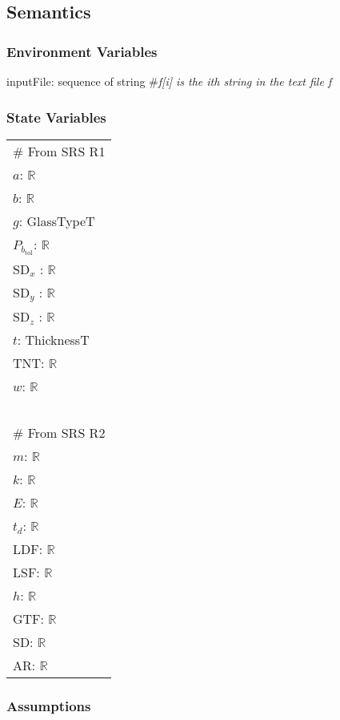 \documentclass[12pt, titlepage]{article}
\begin{document}
\subsection{Semantics}

\subsubsection{Environment Variables}

inputFile: sequence of string \#\textit{f[i] is the ith string in the text file f}

\subsubsection{State Variables}

\renewcommand{\arraystretch}{1.2}
\begin{longtable*}[l]{l} 
\# From SRS R1\\
$a$: $\mathbb{R}$ \\
$b$: $\mathbb{R}$ \\
$g$: GlassTypeT \\
$P_{b_\text{tol}}$: $\mathbb{R}$ \\
$\text{SD}_x$ : $\mathbb{R}$ \\
$\text{SD}_y$ : $\mathbb{R}$ \\
$\text{SD}_z$ : $\mathbb{R}$ \\
$t$: ThicknessT \\
TNT: $\mathbb{R}$ \\
$w$: $\mathbb{R}$ \\
~\\
\# From SRS R2\\
$m$: $\mathbb{R}$ \\
$k$: $\mathbb{R}$ \\
$E$: $\mathbb{R}$ \\
$t_d$: $\mathbb{R}$ \\
LDF: $\mathbb{R}$ \\
LSF: $\mathbb{R}$ \\
$h$: $\mathbb{R}$ \\
GTF: $\mathbb{R}$\\
SD: $\mathbb{R}$\\
AR: $\mathbb{R}$\\
\end{longtable*}

\subsubsection{Assumptions}
\end{document}
